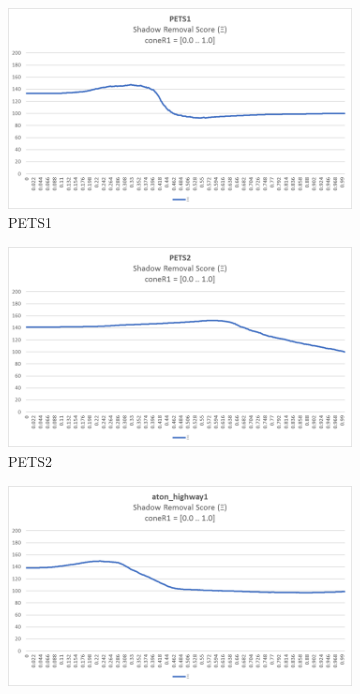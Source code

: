 \begin{figure}
  \begin{subfigure}{.45\linewidth}
  \includegraphics[width=1\linewidth]{figures/pets1_coneR1_score.jpg}
  \caption{PETS1}
\end{subfigure}
\hfill
\begin{subfigure}{.45\linewidth}
  \includegraphics[width=1\linewidth]{figures/pets2_coneR1_score.jpg}
  \caption{PETS2}
\end{subfigure}
\hfill
\begin{subfigure}{.45\linewidth}
  \includegraphics[width=1\linewidth]{figures/highway1_coneR1_score.jpg}

\end{subfigure}
\end{figure}
